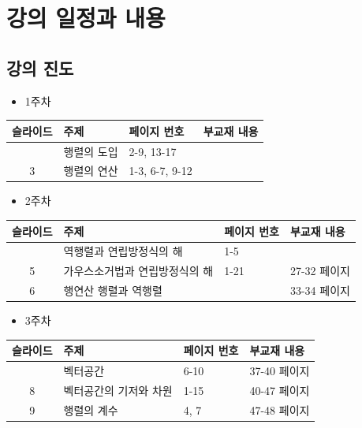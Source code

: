 \documentclass[
  11pt,
  a4paper,
  oneside]{scrbook}
\providecommand{\tightlist}{%
  \setlength{\itemsep}{0pt}\setlength{\parskip}{0pt}}\usepackage{longtable,booktabs,array}
\theoremstyle{definition}
\theoremstyle{definition}
\theoremstyle{plain}
\theoremstyle{remark}
\begin{document}

\chapter{강의 일정과 내용}\label{schedule}

\section{강의 진도}\label{uxac15uxc758-uxc9c4uxb3c4}

\begin{itemize}
\tightlist
\item
  1주차
\end{itemize}

\begin{longtable}[]{@{}clll@{}}
\toprule\noalign{}
슬라이드 & 주제 & 페이지 번호 & 부교재 내용 \\
\midrule\noalign{}
\endhead
\bottomrule\noalign{}
\endlastfoot
2 & 행렬의 도입 & 2-9, 13-17 & \\
3 & 행렬의 연산 & 1-3, 6-7, 9-12 & \\
\end{longtable}

\begin{itemize}
\tightlist
\item
  2주차
\end{itemize}

\begin{longtable}[]{@{}clll@{}}
\toprule\noalign{}
슬라이드 & 주제 & 페이지 번호 & 부교재 내용 \\
\midrule\noalign{}
\endhead
\bottomrule\noalign{}
\endlastfoot
4 & 역행렬과 연립방정식의 해 & 1-5 & \\
5 & 가우스소거법과 연립방정식의 해 & 1-21 & 27-32 페이지 \\
6 & 행연산 행렬과 역행렬 & & 33-34 페이지 \\
\end{longtable}

\begin{itemize}
\tightlist
\item
  3주차
\end{itemize}

\begin{longtable}[]{@{}clll@{}}
\toprule\noalign{}
슬라이드 & 주제 & 페이지 번호 & 부교재 내용 \\
\midrule\noalign{}
\endhead
\bottomrule\noalign{}
\endlastfoot
7 & 벡터공간 & 6-10 & 37-40 페이지 \\
8 & 벡터공간의 기저와 차원 & 1-15 & 40-47 페이지 \\
9 & 행렬의 계수 & 4, 7 & 47-48 페이지 \\
\end{longtable}
\end{document}

